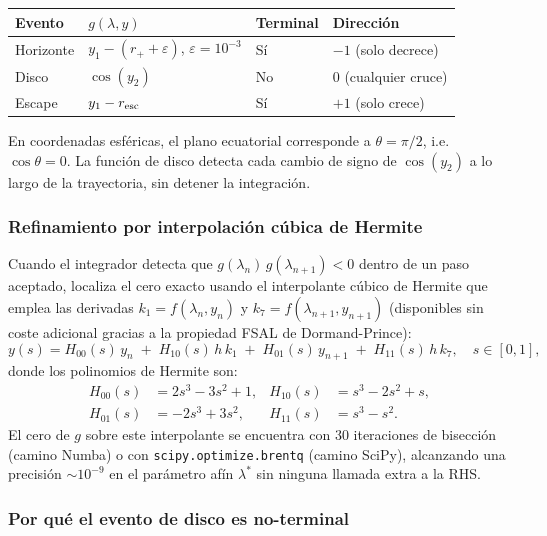 \documentclass[11pt,a4paper]{article}
\begin{document}
\begin{center}
\small
\begin{tabular}{@{}llll@{}}
\toprule
\textbf{Evento} & \textbf{$g(\lambda, y)$} & \textbf{Terminal} & \textbf{Dirección} \\
\midrule
Horizonte & $y_1 - (r_{+} + \varepsilon)$, \; $\varepsilon = 10^{-3}$ &
  Sí & $-1$ (solo decrece) \\
Disco     & $\cos(y_2)$ &
  No & $0$ (cualquier cruce) \\
Escape    & $y_1 - r_{\rm esc}$ &
  Sí & $+1$ (solo crece) \\
\bottomrule
\end{tabular}
\end{center}

En coordenadas esféricas, el plano ecuatorial corresponde a
$\theta = \pi/2$, i.e.\ $\cos\theta = 0$. La función de disco detecta
cada cambio de signo de $\cos(y_2)$ a lo largo de la trayectoria,
sin detener la integración.

\subsubsection{Refinamiento por interpolación cúbica de Hermite}

Cuando el integrador detecta que $g(\lambda_n)\,g(\lambda_{n+1}) < 0$
dentro de un paso aceptado, localiza el cero exacto usando el
interpolante cúbico de Hermite que emplea las derivadas $k_1 = f(\lambda_n, y_n)$
y $k_7 = f(\lambda_{n+1}, y_{n+1})$ (disponibles sin coste adicional
gracias a la propiedad FSAL de Dormand-Prince):
\[
  y(s) = H_{00}(s)\,y_n \;+\; H_{10}(s)\,h\,k_1
         \;+\; H_{01}(s)\,y_{n+1} \;+\; H_{11}(s)\,h\,k_7,
  \quad s \in [0,1],
\]
donde los polinomios de Hermite son:
\begin{align*}
  H_{00}(s) &= 2s^3 - 3s^2 + 1, &
  H_{10}(s) &= s^3 - 2s^2 + s, \\
  H_{01}(s) &= -2s^3 + 3s^2, &
  H_{11}(s) &= s^3 - s^2.
\end{align*}
El cero de $g$ sobre este interpolante se encuentra con 30 iteraciones
de bisección (camino Numba) o con \texttt{scipy.optimize.brentq}
(camino SciPy), alcanzando una precisión $\sim 10^{-9}$ en el parámetro
afín $\lambda^*$ sin ninguna llamada extra a la RHS.

\subsubsection{Por qué el evento de disco es no-terminal}
\end{document}
